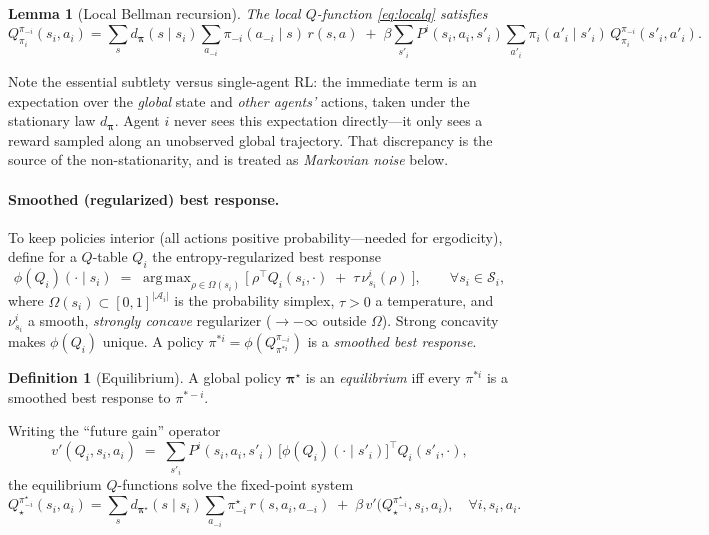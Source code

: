 \documentclass[11pt]{article}
\theoremstyle{plain}
\newtheorem{lemma}{Lemma}
\theoremstyle{definition}
\newtheorem{definition}{Definition}
\newcommand{\calS}{\mathcal{S}}
\newcommand{\calA}{\mathcal{A}}
\newcommand{\bpi}{\bm{\pi}}
\DeclareMathOperator*{\argmax}{arg\,max}
\begin{document}
\begin{lemma}[Local Bellman recursion]
\label{lem:bellman}
The local $Q$-function \eqref{eq:localq} satisfies
\begin{equation}
  Q^{\pi_{-i}}_{\pi_i}(s_i,a_i)
  = \sum_{s} d_{\bpi}(s\mid s_i)\!\sum_{a_{-i}}\pi_{-i}(a_{-i}\mid s)\,r(s,a)
  \;+\; \beta \sum_{s'_i} P^i(s_i,a_i,s'_i)\!\sum_{a'_i}\pi_i(a'_i\mid s'_i)\,
        Q^{\pi_{-i}}_{\pi_i}(s'_i,a'_i).
  \label{eq:localbellman}
\end{equation}
\end{lemma}

\noindent Note the essential subtlety versus single-agent RL: the immediate
term is an expectation over the \emph{global} state and \emph{other agents'}
actions, taken under the stationary law $d_{\bpi}$. Agent $i$ never sees this
expectation directly---it only sees a reward sampled along an unobserved global
trajectory. That discrepancy is the source of the non-stationarity, and is
treated as \emph{Markovian noise} below.

\paragraph{Smoothed (regularized) best response.} To keep policies interior
(all actions positive probability---needed for ergodicity), define for a
$Q$-table $Q_i$ the entropy-regularized best response
\begin{equation}
  \phi(Q_i)(\cdot\mid s_i)
  \;=\;\argmax_{\rho\in\Omega(s_i)}
  \Big[\ \rho^{\top} Q_i(s_i,\cdot) \;+\; \tau\,\nu^i_{s_i}(\rho)\ \Big],
  \qquad \forall s_i\in\calS_i,
  \label{eq:softbr}
\end{equation}
where $\Omega(s_i)\subset[0,1]^{|\calA_i|}$ is the probability simplex, $\tau>0$
a temperature, and $\nu^i_{s_i}$ a smooth, \emph{strongly concave} regularizer
($\to -\infty$ outside $\Omega$). Strong concavity makes $\phi(Q_i)$ unique.
A policy $\pi^{*i}=\phi(Q^{\pi_{-i}}_{\pi^{*i}})$ is a \emph{smoothed best
response}.

\begin{definition}[Equilibrium]
A global policy $\bpi^\star$ is an \emph{equilibrium} iff every $\pi^{*i}$ is a
smoothed best response to $\pi^{*-i}$.
\end{definition}

\noindent Writing the ``future gain'' operator
\begin{equation}
  v'(Q_i,s_i,a_i)\;=\;\sum_{s'_i}P^i(s_i,a_i,s'_i)\,
  \big[\phi(Q_i)(\cdot\mid s'_i)\big]^{\top} Q_i(s'_i,\cdot),
  \label{eq:futuregain}
\end{equation}
the equilibrium $Q$-functions solve the fixed-point system
\begin{equation}
  Q^{\pi^{\star}_{-i}}_{\star}(s_i,a_i)
  = \sum_{s} d_{\bpi^\star}(s\mid s_i)\!\sum_{a_{-i}}\pi^{\star}_{-i}\,
    r(s,a_i,a_{-i}) \;+\; \beta\, v'\!\big(Q^{\pi^{\star}_{-i}}_{\star},s_i,a_i\big),
  \quad \forall i,s_i,a_i.
\end{equation}
\end{document}
